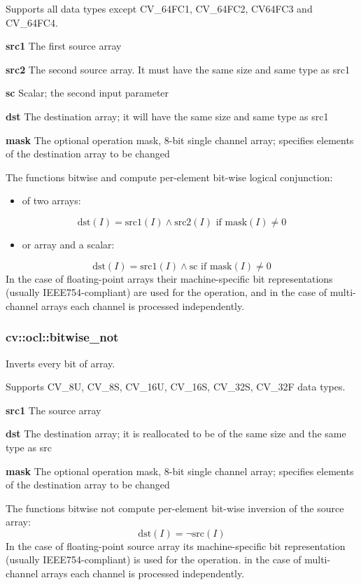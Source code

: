 \documentclass{article}
\begin{document}
Supports all data types except CV{\_}64FC1, CV{\_}64FC2, CV64FC3 and
CV{\_}64FC4.

\textbf{src1 }The first source array

\textbf{src2 }The second source array. It must have the same size and same
type as src1

\textbf{sc }Scalar; the second input parameter

\textbf{dst }The destination array; it will have the same size and same type
as src1

\textbf{mask }The optional operation mask, 8-bit single channel array;
specifies elements of the destination array to be changed

The functions bitwise and compute per-element bit-wise logical conjunction:

\begin{itemize}
\item of two arrays:
\end{itemize}
\[
\mbox{dst}\left( I \right)=\mbox{src1}\left( I \right)\wedge
\mbox{src2}\left( I \right)\mbox{ if mask}\left( I \right)\ne 0
\]
\begin{itemize}
\item or array and a scalar:
\end{itemize}
\[
\mbox{dst}\left( I \right)=\mbox{src1}\left( I \right)\wedge \mbox{sc if
mask}\left( I \right)\ne 0
\]
In the case of floating-point arrays their machine-specific bit
representations (usually IEEE754-compliant) are used for the operation, and
in the case of multi-channel arrays each channel is processed independently.

\newpage

\subsubsection{cv::ocl::bitwise{\_}not }
\label{subsubsec:mylabel7}
Inverts every bit of array.

Supports CV{\_}8U, CV{\_}8S, CV{\_}16U, CV{\_}16S, CV{\_}32S, CV{\_}32F data
types.

\textbf{src1 }The source array

\textbf{dst }The destination array; it is reallocated to be of the same size
and the same type as src

\textbf{mask }The optional operation mask, 8-bit single channel array;
specifies elements of the destination array to be changed

The functions bitwise not compute per-element bit-wise inversion of the
source array:
\[
\mbox{dst}\left( I \right)=\neg \mbox{src}\left( I \right)
\]
In the case of floating-point source array its machine-specific bit
representation (usually IEEE754-compliant) is used for the operation. in the
case of multi-channel arrays each channel is processed independently.
\end{document}
